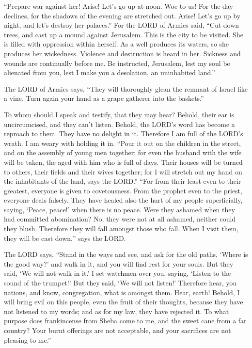  ``Prepare war against her! Arise! Let's go up at noon. Woe
to us! For the day declines, for the shadows of the evening are
stretched out.  Arise! Let's go up by night, and let's
destroy her palaces.''  For the LORD of Armies said, ``Cut
down trees, and cast up a mound against Jerusalem. This is the city to
be visited. She is filled with oppression within herself. 
As a well produces its waters, so she produces her wickedness. Violence
and destruction is heard in her. Sickness and wounds are continually
before me.  Be instructed, Jerusalem, lest my soul be
alienated from you, lest I make you a desolation, an uninhabited land.''

 The LORD of Armies says, ``They will thoroughly glean the
remnant of Israel like a vine. Turn again your hand as a grape gatherer
into the baskets.''

 To whom should I speak and testify, that they may hear?
Behold, their ear is uncircumcised, and they can't listen. Behold, the
LORD's word has become a reproach to them. They have no delight in it.
 Therefore I am full of the LORD's wrath. I am weary with
holding it in. ``Pour it out on the children in the street, and on the
assembly of young men together; for even the husband with the wife will
be taken, the aged with him who is full of days.  Their
houses will be turned to others, their fields and their wives together;
for I will stretch out my hand on the inhabitants of the land, says the
LORD.''  ``For from their least even to their greatest,
everyone is given to covetousness. From the prophet even to the priest,
everyone deals falsely.  They have healed also the hurt of
my people superficially, saying, `Peace, peace!' when there is no peace.
 Were they ashamed when they had committed abomination? No,
they were not at all ashamed, neither could they blush. Therefore they
will fall amongst those who fall. When I visit them, they will be cast
down,'' says the LORD.

 The LORD says, ``Stand in the ways and see, and ask for
the old paths, `Where is the good way?' and walk in it, and you will
find rest for your souls. But they said, `We will not walk in it.'
 I set watchmen over you, saying, `Listen to the sound of
the trumpet!' But they said, `We will not listen!' 
Therefore hear, you nations, and know, congregation, what is amongst
them.  Hear, earth! Behold, I will bring evil on this
people, even the fruit of their thoughts, because they have not listened
to my words; and as for my law, they have rejected it.  To
what purpose does frankincense from Sheba come to me, and the sweet cane
from a far country? Your burnt offerings are not acceptable, and your
sacrifices are not pleasing to me.''

